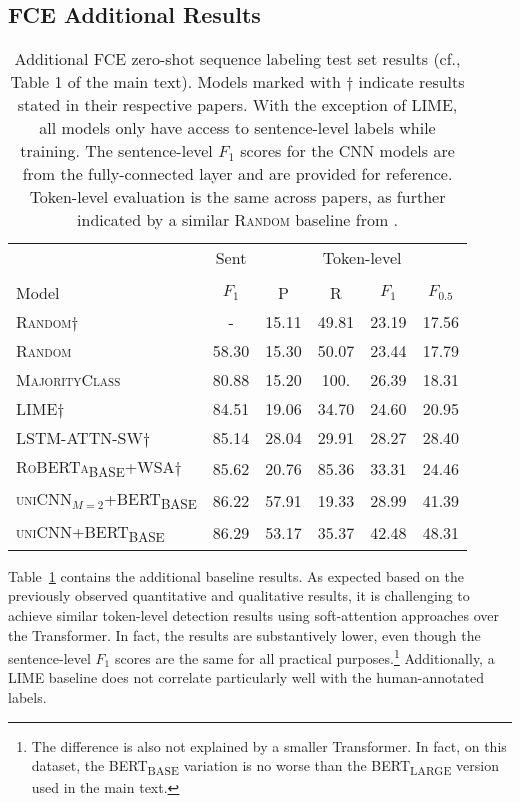 \documentclass{clv3}
\begin{document}
\subsection{FCE Additional Results}

\begin{table}
\caption[Main results]{Additional FCE zero-shot sequence labeling test set results (cf., Table 1 of the main text). Models marked with $\dagger$ indicate results stated in their respective papers. With the exception of \textsc{LIME}, all models only have access to sentence-level labels while training. The sentence-level $F_1$ scores for the CNN models are from the fully-connected layer and are provided for reference. Token-level evaluation is the same across papers, as further indicated by a similar \textsc{Random} baseline from \citet{BujelEtAl-2021-Zeroshot-Weighted-Attention}.} 
\label{table:fce-test-results-additional}
\begin{tabular}{lccccc}
\toprule
 & \multicolumn{1}{c}{Sent} & \multicolumn{4}{c}{Token-level} \\
 \cmidrule[0.75pt](lr){2-2}\cmidrule[0.75pt](lr){3-6} \\
Model & $F_1$ & P & R & $F_1$ & $F_{0.5}$ \\
\midrule
\textsc{Random}$\dagger$ & - & 15.11 & 49.81 & 23.19 & 17.56\\
\textsc{Random} & 58.30 & 15.30 & 50.07 & 23.44 & 17.79\\
\textsc{MajorityClass} & 80.88 & 15.20 & 100. & 26.39 & 18.31\\
\midrule
\textsc{LIME}$\dagger$ & 84.51 & 19.06 & 34.70 & 24.60 & 20.95\\
\midrule
\textsc{LSTM-ATTN-SW}$\dagger$ & 85.14 & 28.04 & 29.91 & 28.27 & 28.40\\
\textsc{RoBERTa\textsubscript{BASE}+WSA}$\dagger$ & 85.62 & 20.76 & 85.36 & 33.31 & 24.46\\
\midrule
\textsc{uniCNN$_{M=2}$+BERT\textsubscript{BASE}} & 86.22 & 57.91 & 19.33 & 28.99 & 41.39 \\
\textsc{uniCNN+BERT\textsubscript{BASE}} & 86.29 & 53.17 & 35.37 & 42.48 & 48.31 \\
\bottomrule
\end{tabular}
\end{table} 

Table~\ref{table:fce-test-results-additional} contains the additional baseline results. As expected based on the previously observed quantitative and qualitative results, it is challenging to achieve similar token-level detection results using soft-attention approaches over the Transformer. In fact, the results are substantively lower, even though the sentence-level $F_1$ scores are the same for all practical purposes.\footnote{The difference is also not explained by a smaller Transformer. In fact, on this dataset, the BERT\textsubscript{BASE} variation is no worse than the BERT\textsubscript{LARGE} version used in the main text.} Additionally, a \textsc{LIME} baseline does not correlate particularly well with the human-annotated labels.
\end{document}
